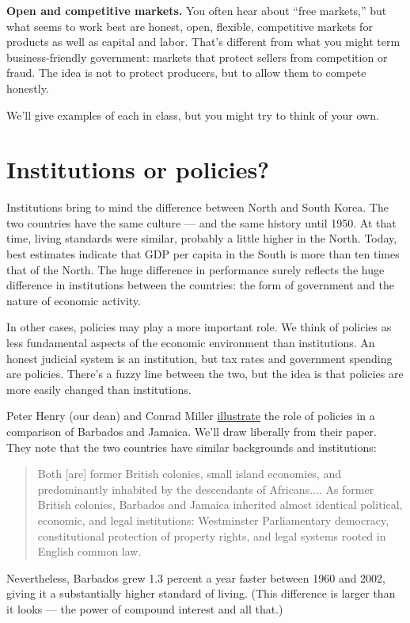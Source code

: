 \textbf{Open and competitive markets.}
You often hear about ``free markets,''
but what seems to work best are honest, open, flexible, competitive markets
for products as well as capital and labor.
That's different from what you might term business-friendly government:
markets that protect sellers from competition or fraud.
The idea is not to protect producers,
but to allow them to compete honestly.

We'll give examples of each in class, but you might try to think of your own.


\section{Institutions or policies?}

Institutions bring to mind the difference between North and South Korea.
The two countries have the same culture --- and the same history until 1950.
At that time, living standards were similar,
probably a little higher in the North.
Today, best estimates indicate that GDP per capita in the South
is more than ten times that of the North.
The huge difference in performance surely reflects the huge difference
in institutions between the countries:
the form of government and the nature of economic activity.


In other cases, policies may play a more important role.
We think of policies as less fundamental aspects of
the economic environment than institutions.
An honest judicial system is an institution,
but tax rates and government spending are policies.
There's a fuzzy line between the two,
but the idea is that policies are more easily
changed than institutions.

Peter Henry (our dean) and Conrad Miller \href{{http://www.aeaweb.org/articles.php?doi=10.1257/aer.99.2.261}}{illustrate}
the role of policies in a comparison
of Barbados and Jamaica.
We'll draw liberally from their paper.
They note that the two countries have similar backgrounds and institutions:
\begin{quote}
Both [are] former British colonies,
small island economies,
and predominantly inhabited by the descendants of Africans....
As former British colonies, Barbados and
Jamaica inherited almost identical political,
economic, and legal institutions: Westminster
Parliamentary democracy, constitutional protection of property rights,
and legal systems rooted in English common law.
\end{quote}
Nevertheless,
Barbados grew 1.3 percent a year faster between 1960 and 2002,
giving it a substantially higher standard of living.
(This difference is larger than it looks --- the power
of compound interest and all that.)


